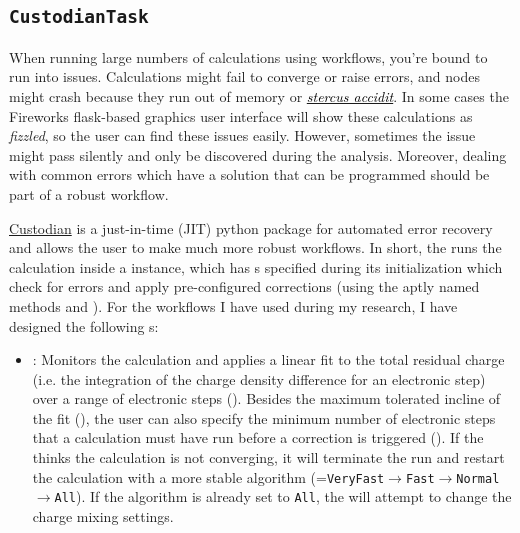 \begin{refsection}
\subsection{\texttt{CustodianTask}} \label{automation:sec-CustodianTask}

When running large numbers of calculations using workflows, you're bound to run into issues. Calculations might fail to converge or raise errors, and nodes might crash because they run out of memory or \href{https://www.urbandictionary.com/define.php?term=stercus\%20accidit}{\textcolor{black}{\textit{stercus accidit}}}. In some cases the Fireworks flask-based graphics user interface will show these calculations as \textit{fizzled}, so the user can find these issues easily. However, sometimes the issue might pass silently and only be discovered during the analysis. Moreover, dealing with common errors which have a solution that can be programmed should be part of a robust workflow.

\href{https://materialsproject.github.io/custodian/}{Custodian} is a just-in-time (JIT) python package for automated error recovery and allows the user to make much more robust workflows. In short, the  runs the calculation inside a  instance, which has s specified during its initialization which check for errors and apply pre-configured corrections (using the aptly named methods  and ). For the workflows I have used during my research, I have designed the following s:

\begin{itemize}

\item {}: Monitors the calculation and applies a linear fit to the total residual charge (i.e. the integration of the charge density difference for an electronic step) over a range of electronic steps (). Besides the maximum tolerated incline of the fit (), the user can also specify the minimum number of electronic steps that a calculation must have run before a correction is triggered (). If the  thinks the calculation is not converging, it will terminate the run and restart the calculation with a more stable algorithm (=\texttt{VeryFast}$\rightarrow$\texttt{Fast}$\rightarrow$\texttt{Normal}$\rightarrow$\texttt{All}). If the algorithm is already set to \texttt{All}, the  will attempt to change the charge mixing settings.


\end{itemize}
\end{refsection}
